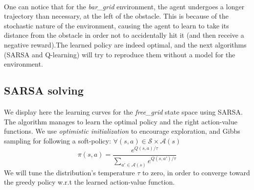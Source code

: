 \documentclass[a4paper]{report}
\begin{document}
{{{				\paragraph{} One can notice that for the \emph{bar\_grid} environment, the agent undergoes a longer trajectory than necessary, at the left of the obstacle. This is because of the stochastic nature of the environment, causing the agent to learn to take its distance from the obstacle in order not to accidentally hit it (and then receive a negative reward).The learned policy are indeed optimal, and the next algorithms (SARSA and Q-learning) will try to reproduce them without a model for the environment. 
			}
			\subsection{SARSA solving}
			{
				\paragraph{} We display here the learning curves for the \emph{free\_grid} state space using SARSA. The algorithm manages to learn the optimal policy and the right action-value functions. We use \emph{optimistic initialization} to encourage exploration, and Gibbs sampling for following a soft-policy: $\forall (s,a) \in\mathcal{S}\times \mathcal{A}(s)$ 
				\begin{equation}
					\pi(s,a) = \displaystyle \frac{ e^{Q(s,a)/\tau}}{\sum_{a'\in\mathcal{A}(s)}e^{Q(s,a')/\tau}}
				\end{equation}
				We will tune the distribution's temperature $\tau$ to zero, in order to converge toward the greedy policy w.r.t the learned action-value function. 
				
}}}
\end{document}
